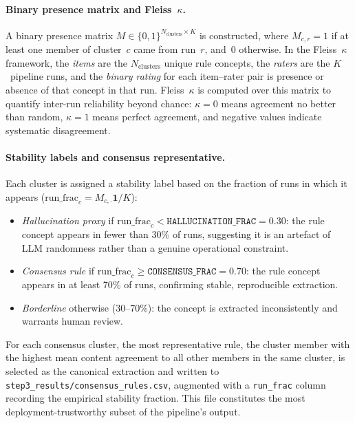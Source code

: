 ﻿\documentclass[11pt]{article}
\begin{document}
\paragraph{Binary presence matrix and Fleiss~$\kappa$.}
A binary presence matrix $M \in \{0,1\}^{N_{\text{clusters}} \times K}$ is
constructed, where $M_{c,r} = 1$ if at least one member of cluster~$c$ came
from run~$r$, and~0 otherwise.
In the Fleiss~$\kappa$ framework, the \emph{items} are the $N_{\text{clusters}}$
unique rule concepts, the \emph{raters} are the $K$~pipeline runs, and the
\emph{binary rating} for each item--rater pair is presence or absence of that
concept in that run.
Fleiss~$\kappa$ is computed over this matrix to quantify inter-run reliability
beyond chance: $\kappa = 0$ means agreement no better than random, $\kappa = 1$
means perfect agreement, and negative values indicate systematic disagreement.

\paragraph{Stability labels and consensus representative.}
Each cluster is assigned a stability label based on the fraction of runs in
which it appears ($\text{run\_frac}_c = M_{c,\cdot}\mathbf{1} / K$):
\begin{itemize}
    \item \emph{Hallucination proxy} if
          $\text{run\_frac}_c < \texttt{HALLUCINATION\_FRAC} = 0.30$:
          the rule concept appears in fewer than 30\% of runs, suggesting it
          is an artefact of LLM randomness rather than a genuine operational
          constraint.
    \item \emph{Consensus rule} if
          $\text{run\_frac}_c \geq \texttt{CONSENSUS\_FRAC} = 0.70$:
          the rule concept appears in at least 70\% of runs, confirming
          stable, reproducible extraction.
    \item \emph{Borderline} otherwise (30--70\%): the concept is extracted
          inconsistently and warrants human review.
\end{itemize}
For each consensus cluster, the most representative rule, the cluster member
with the highest mean content agreement to all other members in the same
cluster, is selected as the canonical extraction and written to
\texttt{step3\_results/consensus\_rules.csv}, augmented with a
\texttt{run\_frac} column recording the empirical stability fraction.
This file constitutes the most deployment-trustworthy subset of the
pipeline's output.
\end{document}
